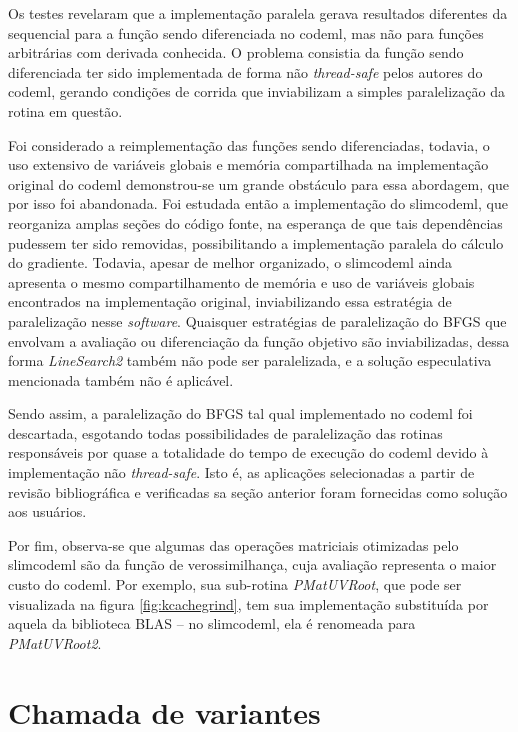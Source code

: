 \documentclass[cic,tc]{iiufrgs}
\begin{document}
Os testes revelaram que a implementação paralela gerava resultados diferentes
da sequencial para a função sendo diferenciada no codeml, mas não para funções
arbitrárias com derivada conhecida. O problema consistia da função sendo
diferenciada ter sido implementada de forma não \textit{thread-safe} pelos
autores do codeml, gerando condições de corrida que inviabilizam a simples
paralelização da rotina em questão.

Foi considerado a reimplementação das funções sendo diferenciadas, todavia, o
uso extensivo de variáveis globais e memória compartilhada na implementação
original do codeml demonstrou-se um grande obstáculo para essa abordagem, que
por isso foi abandonada. Foi estudada então a implementação do slimcodeml, que
reorganiza amplas seções do código fonte, na esperança de que tais
dependências pudessem ter sido removidas, possibilitando a implementação
paralela do cálculo do gradiente. Todavia, apesar de melhor organizado, o
slimcodeml ainda apresenta o mesmo compartilhamento de memória e uso de
variáveis globais encontrados na implementação original, inviabilizando essa
estratégia de paralelização nesse \textit{software}. Quaisquer estratégias de
paralelização do BFGS que envolvam a avaliação ou diferenciação da função
objetivo são inviabilizadas, dessa forma \textit{LineSearch2} também não pode
ser paralelizada, e a solução especulativa mencionada também não é aplicável.

Sendo assim, a paralelização do BFGS tal qual implementado no codeml foi
descartada, esgotando todas possibilidades de paralelização das rotinas
responsáveis por quase a totalidade do tempo de execução do codeml devido à
implementação não \textit{thread-safe}. Isto é, as aplicações selecionadas a
partir de revisão bibliográfica e verificadas sa seção anterior foram
fornecidas como solução aos usuários.

Por fim, observa-se que algumas das operações matriciais otimizadas pelo
slimcodeml são da função de verossimilhança, cuja avaliação representa o maior
custo do codeml. Por exemplo, sua sub-rotina \textit{PMatUVRoot}, que pode ser
visualizada na figura \ref{fig:kcachegrind}, tem sua implementação substituída
por aquela da biblioteca BLAS -- no slimcodeml, ela é renomeada para
\textit{PMatUVRoot2}.

\section{Chamada de variantes}
\label{sec:SAMtools}
\end{document}
